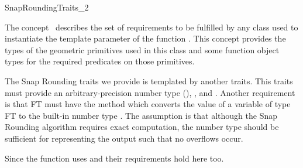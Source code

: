 

\begin{ccRefConcept}{SnapRoundingTraits_2}


\ccDefinition
  
The concept \ccRefName\ describes the set of requirements to be
fulfilled by any class used to instantiate the template parameter of
the function .
This concept provides the types of the geometric primitives used in
this class and some function object types for the required
predicates on those primitives.

The Snap Rounding traits we provide is templated by another traits.
This traits must provide an arbitrary-precision number type (), ,
 and . Another requirement is that FT must have
the method  which converts the value of a variable of type FT to
the built-in number type . The assumption is that although the Snap Rounding
algorithm requires exact computation, the  number type should be sufficient
for representing the output such that no overflows occur.

Since the  function uses  and 
their requirements hold here too.

\ccTypes
{}
\ccGlue
{}
\ccGlue
{}

\ccGlue
{}
\ccGlue


\end{ccRefConcept}
